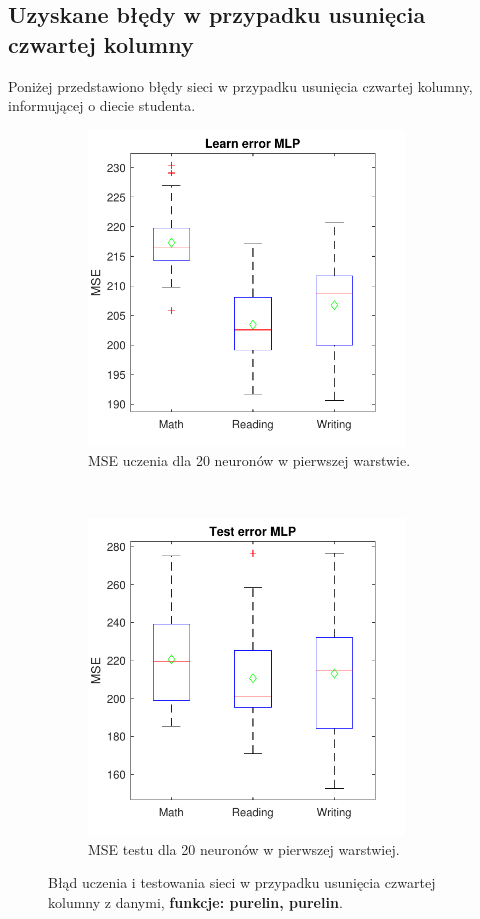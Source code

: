 \documentclass[12pt]{article}
\begin{document}
\subsection{Uzyskane błędy w przypadku usunięcia czwartej kolumny}
Poniżej przedstawiono błędy sieci w przypadku usunięcia czwartej kolumny, informującej o diecie studenta.
\begin{figure}[H]
\centering
\begin{subfigure}[t]{0.48\textwidth} 
\centering
\includegraphics[height=3.3in]{purelin_purelin_20_without_4_learnBoxplot.pdf}
\caption{MSE uczenia dla  20 neuronów w pierwszej warstwie.}
\end{subfigure}
~~
\begin{subfigure}[t]{0.48\textwidth} 
\centering
\includegraphics[height=3.3in]{purelin_purelin_20_without_4_testBoxplot.pdf}
\caption{MSE testu dla  20  neuronów w pierwszej warstwiej.}
\end{subfigure}

\caption{Błąd uczenia i testowania sieci w przypadku usunięcia czwartej  kolumny z danymi, \textbf{funkcje: purelin, purelin}.}
\end{figure}
\end{document}
